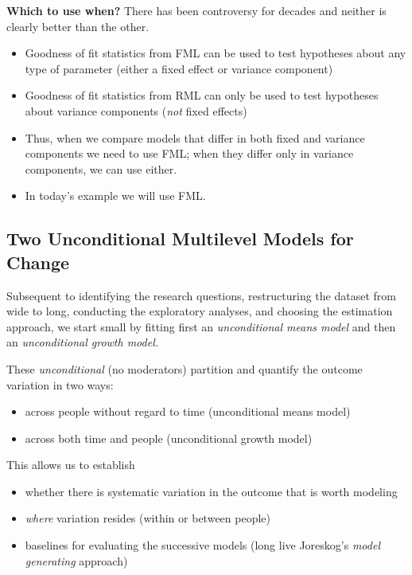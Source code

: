 \documentclass[
  english,
]{book}
\providecommand{\tightlist}{%
  \setlength{\itemsep}{0pt}\setlength{\parskip}{0pt}}
\begin{document}
\textbf{Which to use when?}
There has been controversy for decades and neither is clearly better than the other.

\begin{itemize}
\tightlist
\item
  Goodness of fit statistics from FML can be used to test hypotheses about any type of parameter (either a fixed effect or variance component)
\item
  Goodness of fit statistics from RML can only be used to test hypotheses about variance components (\emph{not} fixed effects)
\item
  Thus, when we compare models that differ in both fixed and variance components we need to use FML; when they differ only in variance components, we can use either.
\item
  In today's example we will use FML.
\end{itemize}

\hypertarget{two-unconditional-multilevel-models-for-change}{%
\subsection{Two Unconditional Multilevel Models for Change}\label{two-unconditional-multilevel-models-for-change}}

Subsequent to identifying the research questions, restructuring the dataset from wide to long, conducting the exploratory analyses, and choosing the estimation approach, we start small by fitting first an \emph{unconditional means model} and then an \emph{unconditional growth model.}

These \emph{unconditional} (no moderators) partition and quantify the outcome variation in two ways:

\begin{itemize}
\tightlist
\item
  across people without regard to time (unconditional means model)
\item
  across both time and people (unconditional growth model)
\end{itemize}

This allows us to establish

\begin{itemize}
\tightlist
\item
  whether there is systematic variation in the outcome that is worth modeling
\item
  \emph{where} variation resides (within or between people)
\item
  baselines for evaluating the successive models (long live Joreskog's \emph{model generating} approach)
\end{itemize}
\end{document}
